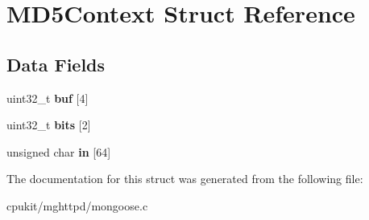 \hypertarget{structMD5Context}{}\section{M\+D5\+Context Struct Reference}
\label{structMD5Context}
\subsection*{Data Fields}
\begin{DoxyCompactItemize}
\item 
\mbox{\label{structMD5Context_a6129b10b90387e1cb1d4cd92e4605c33}} 
uint32\+\_\+t {\bfseries buf} \mbox{[}4\mbox{]}
\item 
\mbox{\label{structMD5Context_a48f837fb64afd013f832e3cdab68e5de}} 
uint32\+\_\+t {\bfseries bits} \mbox{[}2\mbox{]}
\item 
\mbox{\label{structMD5Context_ae8be45f236e5cb12b0ae79da77e5f929}} 
unsigned char {\bfseries in} \mbox{[}64\mbox{]}
\end{DoxyCompactItemize}


The documentation for this struct was generated from the following file\+:\begin{DoxyCompactItemize}
\item 
cpukit/mghttpd/mongoose.\+c\end{DoxyCompactItemize}
